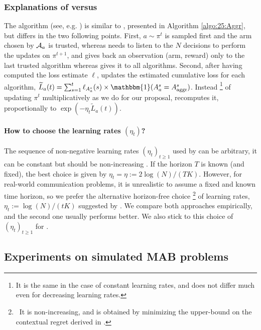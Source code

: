 \subsubsection{Explanations of \Aggr{} versus \ExpQ{} }\label{sub:25:Exp4}

The \ExpQ{} algorithm (see, e.g. \cite[Section 4.2]{Bubeck12})
is similar to \Aggr{}, presented in Algorithm \ref{algo:25:Aggr},
but differs in the two following points.
%
First, $a\sim\pi^t$ is sampled first and the arm chosen by $\mathcal{A}_a$ is trusted, whereas \Aggr{}
needs to listen to the $N$ decisions to perform the updates on $\pi^{t+1}$,
and \ExpQ{} gives back an observation (arm, reward) only to the last trusted algorithm
whereas \Aggr{} gives it to all algorithms.
%
Second, after having computed the loss estimate $\ell$, \ExpQ{} updates the estimated cumulative loss for each algorithm,
$\widetilde{L}_a(t) = \sum_{s=1}^{t} \ell_{A_a^s}(s) \times \mathbbm{1}(A^{s}_{a} = A^{s}_{\mathrm{aggr}})$.
%
Instead
\footnote{It is the same in the case of constant learning rates, and does not differ much even for decreasing learning rates.}
of updating $\pi^{t}$ multiplicatively as we do for our proposal, \ExpQ{} recomputes it, proportionally to
$\exp(- \eta_t \widetilde{L}_a(t))$.

\paragraph{How to choose the learning rates $(\eta_t)$?}
%
The sequence of non-negative learning rates $(\eta_t)_{t \geq 1}$ used by \ExpQ{} can be arbitrary, it can be constant but should be non-increasing \cite[Theorem 4.2]{Bubeck12}.
If the horizon $T$ is known (and fixed), the best choice is given by $\eta_t = \eta := 2 \log(N) / (T K)$.
However, for real-world communication problems, it is unrealistic to assume a fixed and known time horizon, so we prefer the alternative horizon-free choice%
\footnote{~It is non-increasing, and is obtained by minimizing the upper-bound on the contextual regret derived in \cite[pp48]{Bubeck12}.}
of learning rates,
$\eta_t := \log(N) / (t K)$ suggested by \cite{Bubeck12}.
We compare both approaches empirically, and the second one usually performs better.
We also stick to this choice of $(\eta_t)_{t \geq 1}$ for \Aggr.



\subsection{Experiments on simulated MAB problems}\label{sub:25:numExp}

